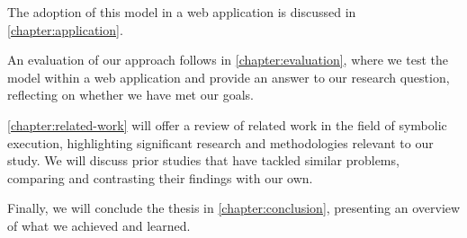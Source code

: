 The adoption of this model in a web application is discussed in
\autoref{chapter:application}. 

An evaluation of our approach follows in  \autoref{chapter:evaluation},  where we test the model within a web application and provide an answer to our research question, reflecting on whether we have met our goals.

\autoref{chapter:related-work} will offer a review of related work in the field of symbolic execution, highlighting significant research and methodologies relevant to our study. We will discuss prior studies that have tackled similar problems, comparing and contrasting their findings with our own. 

Finally, we will conclude the thesis in \autoref{chapter:conclusion}, presenting an overview of what we achieved and learned.